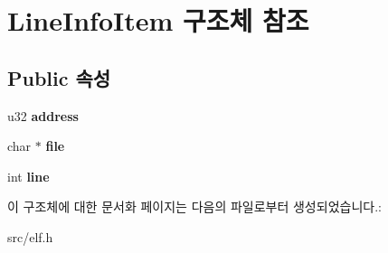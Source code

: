 \hypertarget{struct_line_info_item}{}\section{Line\+Info\+Item 구조체 참조}
\label{struct_line_info_item}
\subsection*{Public 속성}
\begin{DoxyCompactItemize}
\item 
\mbox{\label{struct_line_info_item_aa5147adab5d2634bec7965619b5773ab}} 
u32 {\bfseries address}
\item 
\mbox{\label{struct_line_info_item_a61a140c862884d34fbf8e13e16ee17af}} 
char $\ast$ {\bfseries file}
\item 
\mbox{\label{struct_line_info_item_aa1c188f0239f74291b066489d1bc86c2}} 
int {\bfseries line}
\end{DoxyCompactItemize}


이 구조체에 대한 문서화 페이지는 다음의 파일로부터 생성되었습니다.\+:\begin{DoxyCompactItemize}
\item 
src/elf.\+h\end{DoxyCompactItemize}
